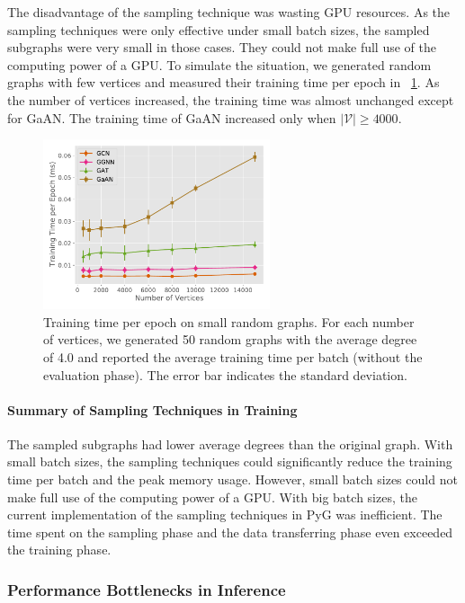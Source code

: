 The disadvantage of the sampling technique was wasting GPU resources.
%
As the sampling techniques were only effective under small batch sizes, the sampled subgraphs were very small in those cases.
%
They could not make full use of the computing power of a GPU.
%
To simulate the situation, we generated random graphs with few vertices and measured their training time per epoch in \figurename~\ref{fig:exp_small_graph_train_time}.
%
As the number of vertices increased, the training time was almost unchanged except for GaAN.
%
The training time of GaAN increased only when $|\mathcal{V}| \geq 4000$.

\begin{figure}[H]
    \centering
    \includegraphics[height=5cm]{figs/experiments/exp_small_graph_train_time.pdf}
    \caption{Training time per epoch on small random graphs. For each number of vertices, we generated 50 random graphs with the average degree of 4.0 and reported the average training time per batch (without the evaluation phase). The error bar indicates the standard deviation.}
    \label{fig:exp_small_graph_train_time}
\end{figure}

\paragraph{Summary of Sampling Techniques in Training}

The sampled subgraphs had lower average degrees than the original graph.
%
With small batch sizes, the sampling techniques could significantly reduce the training time per batch and the peak memory usage.
%
However, small batch sizes could not make full use of the computing power of a GPU.
%
With big batch sizes, the current implementation of the sampling techniques in PyG was inefficient.
%
The time spent on the sampling phase and the data transferring phase even exceeded the training phase.

\subsubsection{Performance Bottlenecks in Inference}

